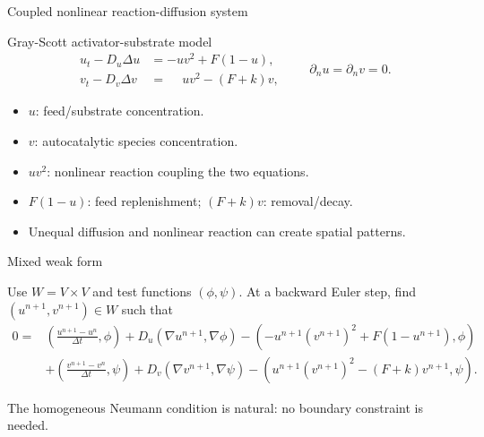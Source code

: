 \documentclass[aspectratio=169, 11pt]{beamer}
\begin{document}
\begin{frame}{Coupled nonlinear reaction-diffusion system}

\begin{block}{Gray-Scott activator-substrate model}
\[
\begin{aligned}
    u_t - D_u\Delta u &= -u v^2 + F(1-u),\\
    v_t - D_v\Delta v &= \phantom{-}u v^2 - (F+k)v,
\end{aligned}
\qquad
\partial_n u=\partial_n v=0.
\]
\end{block}

\medskip
\small
\begin{itemize}
    \item $u$: feed/substrate concentration.
    \item $v$: autocatalytic species concentration.
    \item $uv^2$: nonlinear reaction coupling the two equations.
    \item $F(1-u)$: feed replenishment; $(F+k)v$: removal/decay.
    \item Unequal diffusion and nonlinear reaction can create spatial patterns.
\end{itemize}

\end{frame}

\begin{frame}{Mixed weak form}

Use $W=V\times V$ and test functions $(\phi,\psi)$.
At a backward Euler step, find $(u^{n+1},v^{n+1})\in W$ such that
\[
\begin{aligned}
0=&
\left(\frac{u^{n+1}-u^n}{\Delta t},\phi\right)
+D_u(\nabla u^{n+1},\nabla\phi)
-(-u^{n+1}(v^{n+1})^2+F(1-u^{n+1}),\phi)\\
&+
\left(\frac{v^{n+1}-v^n}{\Delta t},\psi\right)
+D_v(\nabla v^{n+1},\nabla\psi)
-(u^{n+1}(v^{n+1})^2-(F+k)v^{n+1},\psi).
\end{aligned}
\]

\medskip
\small
The homogeneous Neumann condition is natural: no boundary constraint is needed.

\end{frame}
\end{document}
